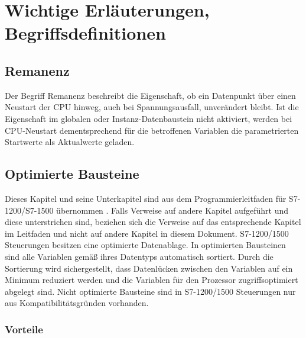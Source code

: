\chapter{Wichtige Erläuterungen, Begriffsdefinitionen}\label{chap:Wichtige Erläuterungen, Begriffsdefinitionen}
\section{Remanenz}\label{sec:Remanenz}

Der Begriff \glqq Remanenz\grqq{} beschreibt die Eigenschaft, ob ein Datenpunkt über einen Neustart der CPU hinweg, auch bei Spannungsausfall, unverändert bleibt. Ist die Eigenschaft im globalen oder Instanz-Datenbaustein nicht aktiviert, werden bei CPU-Neustart dementsprechend für die betroffenen Variablen die parametrierten Startwerte als Aktualwerte geladen.

\clearpage

\section{Optimierte Bausteine}\label{sec:Optimierte Bausteine}

Dieses Kapitel und seine Unterkapitel sind aus dem Programmierleitfaden für S7-1200/S7-1500 übernommen \cite[13]{Siemens:SafetyS7_1200-1500}. Falls Verweise auf andere Kapitel aufgeführt und diese unterstrichen sind, beziehen sich die Verweise auf das entsprechende Kapitel im Leitfaden und nicht auf andere Kapitel in diesem Dokument.
S7-1200/1500 Steuerungen besitzen eine optimierte Datenablage. In optimierten Bausteinen sind alle Variablen gemäß ihres Datentyps automatisch sortiert. Durch die Sortierung wird sichergestellt, dass Datenlücken zwischen den Variablen auf ein Minimum reduziert werden und die Variablen für den Prozessor zugriffsoptimiert abgelegt sind.  
Nicht optimierte Bausteine sind in S7-1200/1500 Steuerungen nur aus Kompatibilitätsgründen vorhanden. 

\subsection{Vorteile}\label{subsec:Vorteile}

